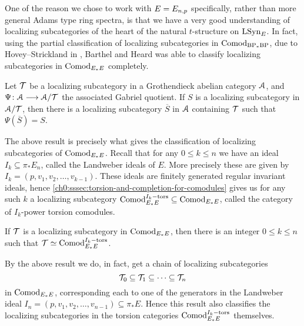 One of the reason we chose to work with $E=E_{n,p}$ specifically, rather than more general Adams type ring spectra, is that we have a very good understanding of localizing subcategories of the heart of the natural $t$-structure on $\mathrm{LSyn}_{E}$. In fact, using the partial classification of localizing subcategories in $\mathrm{Comod}_{\mathrm{BP}_*\mathrm{BP}}$, due to Hovey--Strickland in \cite{hovey-strickland_2005a}, Barthel and Heard was able to classify localizing subcategories in $\mathrm{Comod}_{E_*E}$ completely. 

\begin{proposition}
    Let $\mathcal{T}$ be a localizing subcategory in a Grothendieck abelian category $\EuScript{A}$, and $\Psi\colon\EuScript{A}\longrightarrow \EuScript{A}/\mathcal{T}$ the associated Gabriel quotient. If $S$ is a localizing subcategory in $\EuScript{A}/\mathcal{T}$, then there is a localizing subcategory $\overline{S}$ in $\EuScript{A}$ containing $\mathcal{T}$ such that $\Psi(\overline{S})=S$. 
\end{proposition}

The above result is precisely what gives the classification of localizing subcategories of $\mathrm{Comod}_{E_*E}$. Recall that for any $0\leq k\leq n$ we have an ideal $I_k \subseteq \pi_* E_n$, called the Landweber ideals of $E$. More precisely these are given by $I_k = (p, v_1, v_2, \ldots, v_{k-1})$. These ideals are finitely generated regular invariant ideals, hence \cref{ch0:sssec:torsion-and-completion-for-comodules} gives us for any such $k$ a localizing subcategory $\mathrm{Comod}_{E_*E}^{I_k-\mathrm{tors}}\subseteq \mathrm{Comod}_{E_*E}$, called the category of $I_k$-power torsion comodules. 

\begin{theorem}
    \label{ch3:add:thm:classification-of-abelian-localizing}
    If $\mathcal{T}$ is a localizing subcategory in $\mathrm{Comod}_{E_*E}$, then there is an integer $0\leq k\leq n$ such that $\mathcal{T} \simeq \mathrm{Comod}_{E_*E}^{I_k-\mathrm{tors}}$. 
\end{theorem}

\begin{remark}
    By the above result we do, in fact, get a chain of localizing subcategories
    \[\mathcal{T}_0 \subseteq \mathcal{T}_1\subseteq \cdots \subseteq \mathcal{T}_n \]
    in $\mathrm{Comod}_{E_*E}$, corresponding each to one of the generators in the Landweber ideal $I_n=(p, v_1, v_2, \ldots, v_{n-1})\subseteq \pi_* E$. Hence this result also classifies the localizing subcategories in the torsion categories $\mathrm{Comod}_{E_*E}^{I_k-\mathrm{tors}}$ themselves.  
\end{remark}

